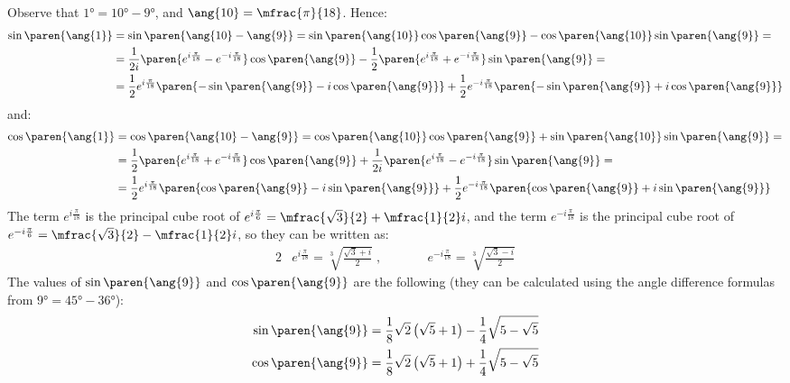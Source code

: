Observe that
$\ang{1} = \ang{10} - \ang{9}$,
and $\ang{10} = \mfrac{\pi}{18}$.
Hence:
\begin{align*}
 \sin\paren{\ang{1}}
 &= \sin\paren{\ang{10} - \ang{9}}
  = \sin\paren{\ang{10}} \cos\paren{\ang{9}}
    - \cos\paren{\ang{10}} \sin\paren{\ang{9}} = \\
 &= \frac{1}{2 i}
    \paren{e^{i \frac{\pi}{18}} - e^{ -i \frac{\pi}{18}}}
    \cos\paren{\ang{9}}
    - \frac{1}{2} \paren{e^{i \frac{\pi}{18}} + e^{ -i \frac{\pi}{18}}}
    \sin\paren{\ang{9}} = \\
 &= \frac{1}{2}
    e^{i \frac{\pi}{18}}
    \paren{ - \sin\paren{\ang{9}} - i \cos\paren{\ang{9}}}
    + \frac{1}{2}
    e^{ -i \frac{\pi}{18}}
    \paren{ - \sin\paren{\ang{9}} + i \cos\paren{\ang{9}}}
\end{align*}
and:
\begin{align*}
 \cos\paren{\ang{1}}
 &= \cos\paren{\ang{10} - \ang{9}}
  = \cos\paren{\ang{10}} \cos\paren{\ang{9}}
    + \sin\paren{\ang{10}} \sin\paren{\ang{9}} = \\
 &= \frac{1}{2}
    \paren{e^{i \frac{\pi}{18}} + e^{ -i \frac{\pi}{18}}}
    \cos\paren{\ang{9}}
    + \frac{1}{2 i}
    \paren{e^{i \frac{\pi}{18}} - e^{ -i \frac{\pi}{18}}}
    \sin\paren{\ang{9}} = \\
 &= \frac{1}{2}
    e^{i \frac{\pi}{18}}
    \paren{ \cos\paren{\ang{9}} - i \sin\paren{\ang{9}}}
    + \frac{1}{2}
    e^{ -i \frac{\pi}{18}}
    \paren{\cos\paren{\ang{9}} + i \sin\paren{\ang{9}}}
\end{align*}
The term $e^{i \frac{\pi}{18}}$
is the principal cube root of
$e^{i \frac{\pi}{6}} = \mfrac{\sqrt{3}}{2} + \mfrac{1}{2} i$,
and the term $e^{- i \frac{\pi}{18}}$
is the principal cube root of
$e^{- i \frac{\pi}{6}} = \mfrac{\sqrt{3}}{2} - \mfrac{1}{2} i$,
so they can be written as:
\begin{alignat*}{2}
 & e^{i \frac{\pi}{18}}
 = \sqrt[3]{\frac{\sqrt{3} + i}{2}} \; , && \qquad
 e^{- i \frac{\pi}{18}}
 = \sqrt[3]{\frac{\sqrt{3} - i}{2}}
\end{alignat*}
The values of $\sin\paren{\ang{9}}$ and $\cos\paren{\ang{9}}$ are the following
(they can be calculated using the angle difference formulas
from $\ang{9} = \ang{45} - \ang{36}$):
\begin{align*}
 \sin\paren{\ang{9}}
 &= \frac{1}{8} \sqrt{2} \, \big(\sqrt{5} + 1 \big)
    - \frac{1}{4} \sqrt{5 - \sqrt{5}}
 \\
 \cos\paren{\ang{9}}
 &= \frac{1}{8} \sqrt{2} \, \big(\sqrt{5} + 1 \big)
    + \frac{1}{4} \sqrt{5 - \sqrt{5}}
\end{align*}
